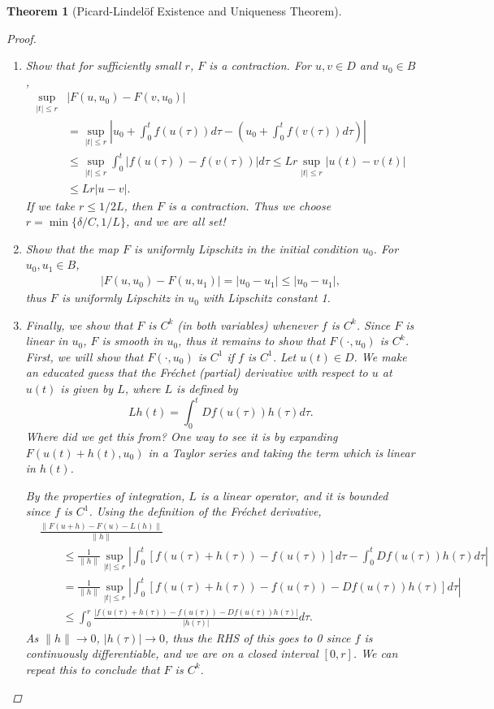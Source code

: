 \documentclass[12pt]{amsart}         %
\newtheorem{theorem}{Theorem}[section]
\theoremstyle{remark}
\begin{document}
\begin{theorem}[Picard-Lindel\"{o}f Existence and Uniqueness Theorem]
\begin{proof}
\begin{enumerate}
\item Show that for sufficiently small $r$, $F$ is a contraction. For $u, v \in D$ and $u_0 \in B$, 
\begin{align*}
\sup_{|t|\leq r}&|F(u, u_0) - F(v, u_0)| \\
&=\sup_{|t|\leq r} \left| u_0 + \int_0^t f(u(\tau)) d \tau - \left(u_0 + \int_0^t f(v(\tau)) d \tau \right) \right| \\
&\leq \sup_{|t|\leq r} \int_0^t | f(u(\tau)) - f(v(\tau))| d \tau
\leq L r \sup_{|t|\leq r} |u(t) - v(t)| \\
&\leq L r |u - v|.
\end{align*}
If we take $r \leq 1/2L$, then $F$ is a contraction. Thus we choose $r = \min\{ \delta/C, 1/L\}$, and we are all set!

\item Show that the map $F$ is uniformly Lipschitz in the initial condition $u_0$. For $u_0, u_1 \in B$,
\begin{align*}
|F(u, u_0) - F(u, u_1)| = |u_0 - u_1| \leq |u_0 - u_1|,
\end{align*} 
thus $F$ is uniformly Lipschitz in $u_0$ with Lipschitz constant 1.

\item Finally, we show that $F$ is $C^k$ (in both variables) whenever $f$ is $C^k$. Since $F$ is linear in $u_0$, $F$ is smooth in $u_0$, thus it remains to show that $F(\cdot, u_0)$ is $C^k$. First, we will show that $F(\cdot, u_0)$ is $C^1$ if $f$ is $C^1$. Let $u(t) \in D$. We make an educated guess that the Fr\'{e}chet (partial) derivative with respect to $u$ at $u(t)$ is given by $L$, where $L$ is defined by 
\[
L h(t) = \int_0^t Df(u(\tau)) h(\tau) d \tau.
\]
Where did we get this from? One way to see it is by expanding $F(u(t) + h(t), u_0)$ in a Taylor series and taking the term which is linear in $h(t)$. 

By the properties of integration, $L$ is a linear operator, and it is bounded since $f$ is $C^1$. Using the definition of the Fr\'{e}chet derivative,
\begin{align*}
&\frac{\|F(u + h) - F(u) - L(h) \|}{\|h\|} \\
&\qquad\leq \frac{1}{\|h\|}
\sup_{|t| \leq r} \left| \int_0^t [ f(u(\tau) + h(\tau)) - f(u(\tau))] d\tau - \int_0^t Df(u(\tau)) h(\tau) d \tau \right| \\
&\qquad= \frac{1}{\|h\|}
\sup_{|t| \leq r} \left| \int_0^t [ f(u(\tau) + h(\tau)) - f(u(\tau)) - Df(u(\tau))h(\tau)] d\tau\right| \\
&\qquad\leq \int_0^r \frac{ | f(u(\tau) + h(\tau)) - f(u(\tau)) - Df(u(\tau))h(\tau)|}{|h(\tau)|} d\tau.
\end{align*}
As $\|h\| \rightarrow 0$, $|h(\tau)| \rightarrow 0$, thus the RHS of this goes to 0 since $f$ is continuously differentiable, and we are on a closed interval $[0, r]$. We can repeat this to conclude that $F$ is $C^k$.


\end{enumerate}
\end{proof}
\end{theorem}
\end{document}
